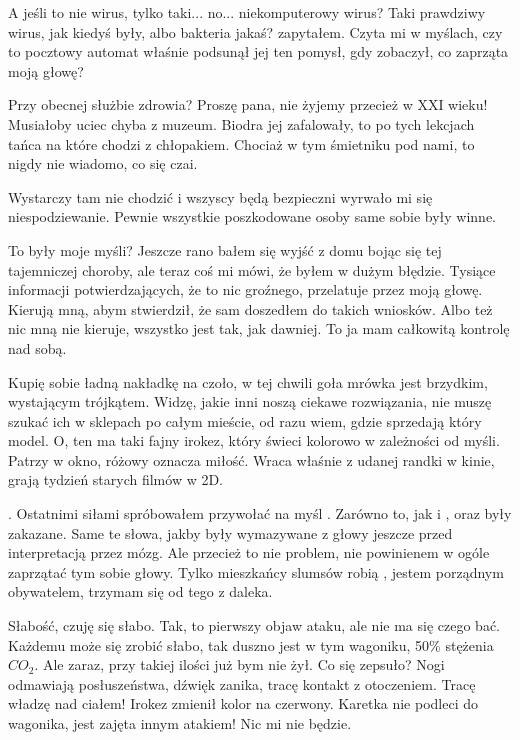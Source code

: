 \ds{} A jeśli to nie wirus, tylko taki... no... niekomputerowy wirus? Taki prawdziwy wirus, jak kiedyś były, albo bakteria jakaś? \dm{}
zapytałem. Czyta mi w myślach, czy to pocztowy automat właśnie podsunął jej ten pomysł, gdy zobaczył, co zaprząta moją głowę?\de{}

\ds{} Przy obecnej służbie zdrowia? Proszę pana, nie żyjemy przecież w XXI wieku! Musiałoby uciec chyba z muzeum.
\dm{} Biodra jej zafalowały, to po tych lekcjach tańca na które chodzi z chłopakiem. \dm{} Chociaż w tym śmietniku pod nami, to nigdy nie wiadomo, co się czai. \de{}

\ds{} Wystarczy tam nie chodzić i wszyscy będą bezpieczni \dm{} wyrwało mi się niespodziewanie. \dm{} Pewnie wszystkie poszkodowane osoby same sobie były winne. \de{}

To były moje myśli? Jeszcze rano bałem się wyjść z domu bojąc się tej tajemniczej choroby, ale teraz coś mi mówi, że byłem w dużym błędzie.
Tysiące informacji potwierdzających, że to nic groźnego, przelatuje przez moją głowę.
Kierują mną, abym stwierdził, że sam doszedłem do takich wniosków.
Albo też nic mną nie kieruje, wszystko jest tak, jak dawniej. To ja mam całkowitą kontrolę nad sobą.

Kupię sobie ładną nakładkę na czoło, w tej chwili goła mrówka jest brzydkim, wystającym trójkątem.
Widzę, jakie inni noszą ciekawe rozwiązania, nie muszę szukać ich w sklepach po całym mieście, od razu wiem, gdzie sprzedają który model.
O, ten ma taki fajny irokez, który świeci kolorowo w zależności od myśli. Patrzy w okno, różowy oznacza miłość.
Wraca właśnie z udanej randki w kinie, grają tydzień starych filmów w 2D.

\censor{}. Ostatnimi siłami spróbowałem przywołać na myśl \censor{}. 
Zarówno to, jak i \censor{}, oraz \censor{} były zakazane.
Same te słowa, jakby były wymazywane z głowy jeszcze przed interpretacją przez mózg.
Ale przecież to nie problem, nie powinienem w ogóle zaprzątać tym sobie głowy. 
Tylko mieszkańcy slumsów robią \censor{}, jestem porządnym obywatelem, trzymam się od tego z daleka.

Słabość, czuję się słabo.
Tak, to pierwszy objaw ataku, ale nie ma się czego bać.
Każdemu może się zrobić słabo, tak duszno jest w tym wagoniku, 50\% stężenia $CO_2$.
Ale zaraz, przy takiej ilości już bym nie żył. Co się zepsuło?
Nogi odmawiają posłuszeństwa, dźwięk zanika, tracę kontakt z otoczeniem.
Tracę władzę nad ciałem! Irokez zmienił kolor na czerwony.
Karetka nie podleci do wagonika, jest zajęta innym atakiem!
Nic mi nie będzie.

